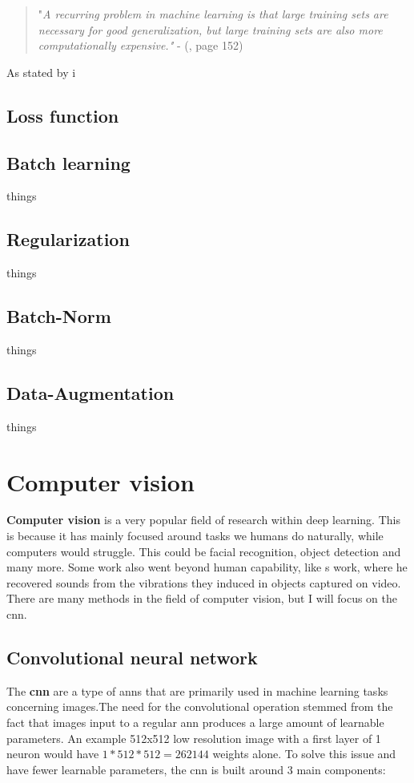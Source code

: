     \begin{quote}
        "\textit{A recurring problem in machine learning is that large training sets are necessary for good generalization, but large training sets are also more computationally
        expensive."} - (\citeauthor{Goodfellow-et-al-2016_SGD}\citeyear{Goodfellow-et-al-2016_SGD}, page 152)
    \end{quote}
    
    As stated by \citeauthor{Goodfellow-et-al-2016_SGD} i
    
\subsection{Loss function}

\subsection{Batch learning}
    things
\subsection{Regularization}
    things
\subsection{Batch-Norm}
    things
\subsection{Data-Augmentation}
    things

\clearpage
\section{Computer vision}
    \textbf{Computer vision} is a very popular field of research within deep learning\cite{voulodimos2018deep_computer_vision}. This is because it has mainly focused around tasks we humans do naturally, while computers would struggle. This could be facial recognition, object detection and many more. Some work also went beyond human capability, like \citeauthor{davis2014visual_deep_video_audio}s\cite{davis2014visual_deep_video_audio} work, where he recovered sounds from the vibrations they induced in objects captured on video. There are many methods in the field of computer vision, but I will focus on the \gls{cnn}.
    
    
    
\subsection{Convolutional neural network} \label{cnn}
    The \textbf{\gls{cnn}} are a type of \gls{ann}s that are primarily used in machine learning tasks concerning images\cite{o2015introduction_convolutions}.The need for the convolutional operation stemmed from the fact that images input to a regular \gls{ann} produces a large amount of learnable parameters. An example 512x512 low resolution image with a first layer of 1 neuron would have $1*512*512 = 262144$ weights alone.  To solve this issue and have fewer learnable parameters, the \gls{cnn} is built around 3 main components\cite{o2015introduction_convolutions}:
    

